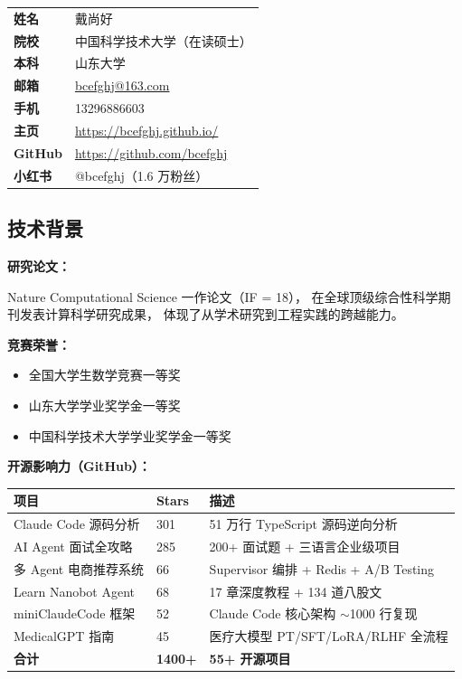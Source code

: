 \documentclass[12pt,a4paper]{ctexart}
\begin{document}
\begin{tcolorbox}[colback=primary!5,colframe=primary,arc=6pt,
  left=12pt,right=12pt,top=10pt,bottom=10pt]
\begin{tabular}{p{4cm} p{10cm}}
\textbf{姓名} & 戴尚好 \\[4pt]
\textbf{院校} & 中国科学技术大学（在读硕士）\\[4pt]
\textbf{本科} & 山东大学 \\[4pt]
\textbf{邮箱} & \href{mailto:bcefghj@163.com}{bcefghj@163.com} \\[4pt]
\textbf{手机} & 13296886603 \\[4pt]
\textbf{主页} & \url{https://bcefghj.github.io/} \\[4pt]
\textbf{GitHub} & \url{https://github.com/bcefghj} \\[4pt]
\textbf{小红书} & @bcefghj（1.6 万粉丝）\\
\end{tabular}
\end{tcolorbox}

\subsection{技术背景}

\textbf{研究论文：}

Nature Computational Science 一作论文（IF = 18），
在全球顶级综合性科学期刊发表计算科学研究成果，
体现了从学术研究到工程实践的跨越能力。

\textbf{竞赛荣誉：}

\begin{itemize}
  \item 全国大学生数学竞赛一等奖
  \item 山东大学学业奖学金一等奖
  \item 中国科学技术大学学业奖学金一等奖
\end{itemize}

\textbf{开源影响力（GitHub）：}

\begin{center}
\begin{tabular}{p{4cm} p{3cm} p{6cm}}
\toprule
\textbf{项目} & \textbf{Stars} & \textbf{描述} \\
\midrule
Claude Code 源码分析 & 301 & 51 万行 TypeScript 源码逆向分析 \\[2pt]
AI Agent 面试全攻略 & 285 & 200+ 面试题 + 三语言企业级项目 \\[2pt]
多 Agent 电商推荐系统 & 66 & Supervisor 编排 + Redis + A/B Testing \\[2pt]
Learn Nanobot Agent & 68 & 17 章深度教程 + 134 道八股文 \\[2pt]
miniClaudeCode 框架 & 52 & Claude Code 核心架构 $\sim$1000 行复现 \\[2pt]
MedicalGPT 指南 & 45 & 医疗大模型 PT/SFT/LoRA/RLHF 全流程 \\[2pt]
\textbf{合计} & \textbf{1400+} & \textbf{55+ 开源项目} \\
\bottomrule
\end{tabular}
\end{center}
\end{document}
